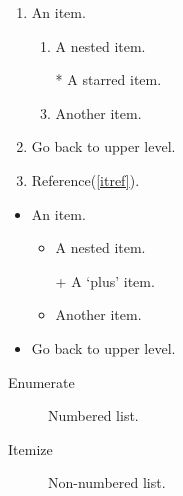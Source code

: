 \documentclass{book}
\begin{document}
        
        \begin{enumerate}
            \item An item.
            \begin{enumerate}
                \item A nested item.
                \item[*] A starred item.
                \item Another item. \label{itref}
            \end{enumerate}
            \item Go back to upper level.
            \item Reference(\ref{itref}).
        \end{enumerate}
        
        \begin{itemize}
            \item An item.
            \begin{itemize}
                \item A nested item.
                \item[+] A ‘plus’ item.
                \item Another item.
            \end{itemize}
            \item Go back to upper level.
        \end{itemize}
        \begin{description}
            \item[Enumerate] Numbered list.
            \item[Itemize] Non-numbered list.
        
        \end{description}
        
\end{document}
